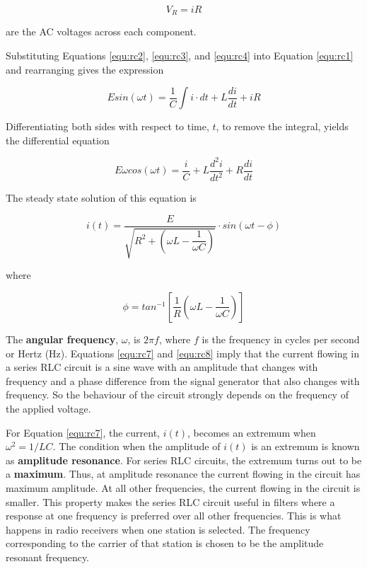 \begin{equation}
V_R=iR
\label{equ:rc4}
\end{equation}

\noindent are the AC voltages across each component.

Substituting Equations \ref{equ:rc2}, \ref{equ:rc3}, and \ref{equ:rc4} into Equation \ref{equ:rc1} and rearranging gives the expression

\begin{equation}
Esin(\omega t)=\dfrac{1}{C}\int i\cdot dt +L\dfrac{di}{dt}+iR
\label{equ:rc5}
\end{equation}

Differentiating both sides with respect to time, $t$, to remove the integral, yields the differential equation


\begin{equation}
E\omega cos(\omega t)=\dfrac{i}{C}+L\dfrac{d^2i}{dt^2}+R\dfrac{di}{dt}
\label{equ:rc6}
\end{equation}

\noindent The steady state solution of this equation is


\begin{equation}
i(t)=\dfrac{E}{\sqrt{R^2+\left(\omega L-\dfrac{1}{\omega C}\right)}}\cdot sin(\omega t-\phi)
\label{equ:rc7}
\end{equation}

\noindent where


\begin{equation}
\phi=tan^{-1}\left[\dfrac{1}{R}\left(\omega L-\dfrac{1}{\omega C}\right)\right]
\label{equ:rc8}
\end{equation}

The {\bf angular frequency}, $\omega$, is $2\pi f$, where $f$ is the frequency in cycles per second or Hertz (Hz). Equations \ref{equ:rc7} and \ref{equ:rc8} imply that the current flowing in a series RLC circuit is a sine wave with an amplitude that changes with frequency and a phase difference from the signal generator that also changes with frequency. So the behaviour of the circuit strongly depends on the frequency of the applied voltage.

For Equation \ref{equ:rc7}, the current, $i(t)$, becomes an extremum when $\omega^2 = 1/LC$. The condition when the amplitude of $i(t)$ is an extremum is known as {\bf amplitude resonance}. For series RLC circuits, the extremum turns out to be a {\bf maximum}. Thus, at amplitude resonance the current flowing in the circuit has maximum amplitude. At all other frequencies, the current flowing in the circuit is smaller. This property makes the series RLC circuit useful in filters where a response at one frequency is preferred over all other frequencies. This is what happens in radio receivers when one station is selected. The frequency corresponding to the carrier of that station is chosen to be the amplitude resonant frequency.

